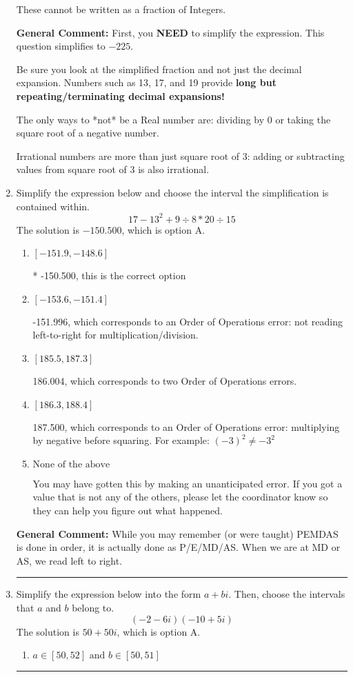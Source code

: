 \documentclass{extbook}[14pt]
\newcommand{\litem}[1]{\item #1

\rule{\textwidth}{0.4pt}}
\begin{document}
\begin{enumerate}
{\begin{enumerate}[label=\Alph*.]
These cannot be written as a fraction of Integers.
\end{enumerate}

\textbf{General Comment:} First, you \textbf{NEED} to simplify the expression. This question simplifies to $-225$. 
 
 Be sure you look at the simplified fraction and not just the decimal expansion. Numbers such as 13, 17, and 19 provide \textbf{long but repeating/terminating decimal expansions!} 
 
 The only ways to *not* be a Real number are: dividing by 0 or taking the square root of a negative number. 
 
 Irrational numbers are more than just square root of 3: adding or subtracting values from square root of 3 is also irrational.
}
\litem{
Simplify the expression below and choose the interval the simplification is contained within.
\[ 17 - 13^2 + 9 \div 8 * 20 \div 15 \]The solution is \( -150.500 \), which is option A.\begin{enumerate}[label=\Alph*.]
\item \( [-151.9, -148.6] \)

* -150.500, this is the correct option
\item \( [-153.6, -151.4] \)

 -151.996, which corresponds to an Order of Operations error: not reading left-to-right for multiplication/division.
\item \( [185.5, 187.3] \)

 186.004, which corresponds to two Order of Operations errors.
\item \( [186.3, 188.4] \)

 187.500, which corresponds to an Order of Operations error: multiplying by negative before squaring. For example: $(-3)^2 \neq -3^2$
\item \( \text{None of the above} \)

 You may have gotten this by making an unanticipated error. If you got a value that is not any of the others, please let the coordinator know so they can help you figure out what happened.
\end{enumerate}

\textbf{General Comment:} While you may remember (or were taught) PEMDAS is done in order, it is actually done as P/E/MD/AS. When we are at MD or AS, we read left to right.
}
\litem{
Simplify the expression below into the form $a+bi$. Then, choose the intervals that $a$ and $b$ belong to.
\[ (-2 - 6 i)(-10 + 5 i) \]The solution is \( 50 + 50 i \), which is option A.\begin{enumerate}[label=\Alph*.]
\item \( a \in [50, 52] \text{ and } b \in [50, 51] \)


\end{enumerate}}
\end{enumerate}
\end{document}
